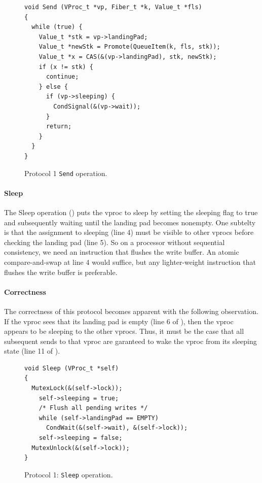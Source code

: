 \documentclass[11pt]{article}
\begin{document}
\begin{figure}
\lstset{language=C}
\lstset{commentstyle=\textit}
\lstset{numbers=left}
\begin{lstlisting}
void Send (VProc_t *vp, Fiber_t *k, Value_t *fls)
{
  while (true) {
    Value_t *stk = vp->landingPad;
    Value_t *newStk = Promote(QueueItem(k, fls, stk));
    Value_t *x = CAS(&(vp->landingPad), stk, newStk);
    if (x != stk) {
      continue;
    } else {
      if (vp->sleeping) {
        CondSignal(&(vp->wait));
      }
      return;
    }
  }
}
\end{lstlisting}
\caption{Protocol 1 \texttt{Send} operation.}\label{fig:protocol1-send}
\end{figure}

\paragraph{Sleep}
The Sleep operation () puts the vproc to sleep by 
setting the sleeping flag to true and subsequently waiting until the landing
pad becomes nonempty.
One subtelty is that the assignment to sleeping (line 4) must be visible
to other vprocs before checking the landing pad (line 5).
So on a processor without sequential consistency, we need an instruction that flushes 
the write buffer.
An atomic compare-and-swap at line 4 would suffice, but any lighter-weight instruction
that flushes the write buffer is preferable.

\paragraph{Correctness}
The correctness of this protocol becomes apparent with the following observation.
If the vproc sees that its landing pad is empty (line 6 of ), 
then the vproc appears to be sleeping to the other vprocs.
Thus, it must be the case that all subsequent sends to that vproc are garanteed to
wake the vproc from its sleeping state (line 11 of ).

\begin{figure}
\lstset{language=C}
\lstset{commentstyle=\textit}
\lstset{numbers=left}
\begin{lstlisting}
void Sleep (VProc_t *self)
{
  MutexLock(&(self->lock));
    self->sleeping = true;
    /* Flush all pending writes */
    while (self->landingPad == EMPTY)
      CondWait(&(self->wait), &(self->lock));
    self->sleeping = false;
  MutexUnlock(&(self->lock));
}
\end{lstlisting}
\caption{Protocol 1: \texttt{Sleep} operation.}\label{fig:protocol1-sleep}
\end{figure}
\end{document}
